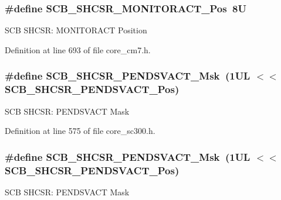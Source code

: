 \subsubsection[{\texorpdfstring{S\+C\+B\+\_\+\+S\+H\+C\+S\+R\+\_\+\+M\+O\+N\+I\+T\+O\+R\+A\+C\+T\+\_\+\+Pos}{SCB_SHCSR_MONITORACT_Pos}}]{\setlength{\rightskip}{0pt plus 5cm}\#define S\+C\+B\+\_\+\+S\+H\+C\+S\+R\+\_\+\+M\+O\+N\+I\+T\+O\+R\+A\+C\+T\+\_\+\+Pos~8U}\hypertarget{group___c_m_s_i_s___s_c_b_ga8b71cf4c61803752a41c96deb00d26af}{}\label{group___c_m_s_i_s___s_c_b_ga8b71cf4c61803752a41c96deb00d26af}
S\+CB S\+H\+C\+SR\+: M\+O\+N\+I\+T\+O\+R\+A\+CT Position 

Definition at line 693 of file core\+\_\+cm7.\+h.

\subsubsection[{\texorpdfstring{S\+C\+B\+\_\+\+S\+H\+C\+S\+R\+\_\+\+P\+E\+N\+D\+S\+V\+A\+C\+T\+\_\+\+Msk}{SCB_SHCSR_PENDSVACT_Msk}}]{\setlength{\rightskip}{0pt plus 5cm}\#define S\+C\+B\+\_\+\+S\+H\+C\+S\+R\+\_\+\+P\+E\+N\+D\+S\+V\+A\+C\+T\+\_\+\+Msk~(1\+U\+L $<$$<$ S\+C\+B\+\_\+\+S\+H\+C\+S\+R\+\_\+\+P\+E\+N\+D\+S\+V\+A\+C\+T\+\_\+\+Pos)}\hypertarget{group___c_m_s_i_s___s_c_b_gae0e837241a515d4cbadaaae1faa8e039}{}\label{group___c_m_s_i_s___s_c_b_gae0e837241a515d4cbadaaae1faa8e039}
S\+CB S\+H\+C\+SR\+: P\+E\+N\+D\+S\+V\+A\+CT Mask 

Definition at line 575 of file core\+\_\+sc300.\+h.

\subsubsection[{\texorpdfstring{S\+C\+B\+\_\+\+S\+H\+C\+S\+R\+\_\+\+P\+E\+N\+D\+S\+V\+A\+C\+T\+\_\+\+Msk}{SCB_SHCSR_PENDSVACT_Msk}}]{\setlength{\rightskip}{0pt plus 5cm}\#define S\+C\+B\+\_\+\+S\+H\+C\+S\+R\+\_\+\+P\+E\+N\+D\+S\+V\+A\+C\+T\+\_\+\+Msk~(1\+U\+L $<$$<$ S\+C\+B\+\_\+\+S\+H\+C\+S\+R\+\_\+\+P\+E\+N\+D\+S\+V\+A\+C\+T\+\_\+\+Pos)}\hypertarget{group___c_m_s_i_s___s_c_b_gae0e837241a515d4cbadaaae1faa8e039}{}\label{group___c_m_s_i_s___s_c_b_gae0e837241a515d4cbadaaae1faa8e039}
S\+CB S\+H\+C\+SR\+: P\+E\+N\+D\+S\+V\+A\+CT Mask 

